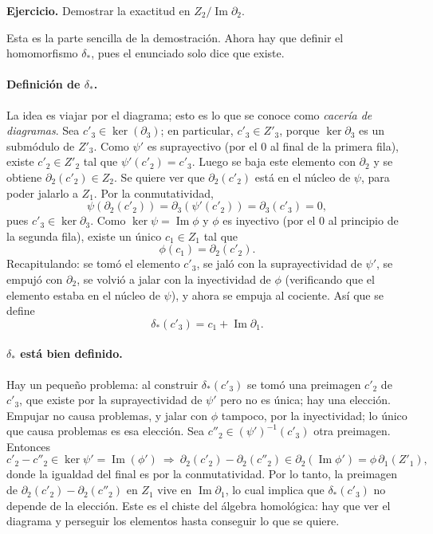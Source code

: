 \documentclass[11pt]{article}
\begin{document}
\medskip\noindent\textbf{Ejercicio.} Demostrar la exactitud en $Z_2/\operatorname{Im}\partial_2$.

\medskip
Esta es la parte sencilla de la demostración. Ahora hay que definir el homomorfismo $\delta_*$, pues el enunciado solo dice que existe.

\paragraph{Definición de $\delta_*$.} La idea es viajar por el diagrama; esto es lo que se conoce como \emph{cacería de diagramas}. Sea $c'_3\in\ker(\partial_3)$; en particular, $c'_3\in Z'_3$, porque $\ker\partial_3$ es un submódulo de $Z'_3$. Como $\psi'$ es suprayectivo (por el $0$ al final de la primera fila), existe $c'_2\in Z'_2$ tal que $\psi'(c'_2)=c'_3$. Luego se baja este elemento con $\partial_2$ y se obtiene $\partial_2(c'_2)\in Z_2$. Se quiere ver que $\partial_2(c'_2)$ está en el núcleo de $\psi$, para poder jalarlo a $Z_1$. Por la conmutatividad,
\[
  \psi(\partial_2(c'_2))=\partial_3(\psi'(c'_2))=\partial_3(c'_3)=0,
\]
pues $c'_3\in\ker\partial_3$. Como $\ker\psi=\operatorname{Im}\phi$ y $\phi$ es inyectivo (por el $0$ al principio de la segunda fila), existe un único $c_1\in Z_1$ tal que
\[
  \phi(c_1)=\partial_2(c'_2).
\]
Recapitulando: se tomó el elemento $c'_3$, se jaló con la suprayectividad de $\psi'$, se empujó con $\partial_2$, se volvió a jalar con la inyectividad de $\phi$ (verificando que el elemento estaba en el núcleo de $\psi$), y ahora se empuja al cociente. Así que se define
\[
  \delta_*(c'_3)=c_1+\operatorname{Im}\partial_1 .
\]

\paragraph{$\delta_*$ está bien definido.} Hay un pequeño problema: al construir $\delta_*(c'_3)$ se tomó una preimagen $c'_2$ de $c'_3$, que existe por la suprayectividad de $\psi'$ pero no es única; hay una elección. Empujar no causa problemas, y jalar con $\phi$ tampoco, por la inyectividad; lo único que causa problemas es esa elección. Sea $c''_2\in(\psi')^{-1}(c'_3)$ otra preimagen. Entonces
\[
  c'_2-c''_2\in\ker\psi'=\operatorname{Im}(\phi')\ \Longrightarrow\ \partial_2(c'_2)-\partial_2(c''_2)\in\partial_2(\operatorname{Im}\phi')=\phi\,\partial_1(Z'_1),
\]
donde la igualdad del final es por la conmutatividad. Por lo tanto, la preimagen de $\partial_2(c'_2)-\partial_2(c''_2)$ en $Z_1$ vive en $\operatorname{Im}\partial_1$, lo cual implica que $\delta_*(c'_3)$ no depende de la elección. Este es el chiste del álgebra homológica: hay que ver el diagrama y perseguir los elementos hasta conseguir lo que se quiere.
\end{document}
